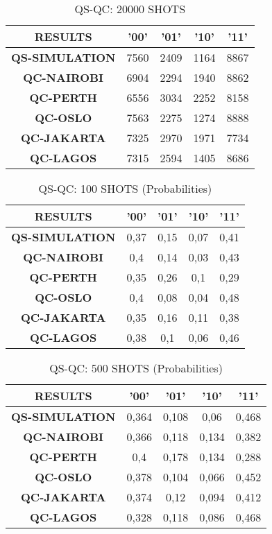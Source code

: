 \begin{table}[!ht]
    \centering
    \begin{tabular}{ccccc}
    \hline
        \textbf{RESULTS} & \textbf{'00'} & \textbf{'01'} & \textbf{'10'} & \textbf{'11' } \\ \hline
        \textbf{QS-SIMULATION} & 7560 & 2409 & 1164 & 8867  \\ 
        \textbf{QC-NAIROBI} & 6904 & 2294 & 1940 & 8862  \\ 
        \textbf{QC-PERTH} & 6556 & 3034 & 2252 & 8158  \\ 
        \textbf{QC-OSLO} & 7563 & 2275 & 1274 & 8888  \\ 
        \textbf{QC-JAKARTA} & 7325 & 2970 & 1971 & 7734  \\ 
        \textbf{QC-LAGOS} & 7315 & 2594 & 1405 & 8686 \\ \hline
    \end{tabular}
    \caption{QS-QC: 20000 SHOTS}
\end{table}

\begin{table}[!ht]
    \centering
    \begin{tabular}{ccccc}
    \hline
        \textbf{RESULTS} & \textbf{'00'} & \textbf{'01'} & \textbf{'10'} & \textbf{'11' } \\ \hline
        \textbf{QS-SIMULATION} & 0,37 & 0,15 & 0,07 & 0,41  \\ 
        \textbf{QC-NAIROBI} & 0,4 & 0,14 & 0,03 & 0,43  \\ 
        \textbf{QC-PERTH} & 0,35 & 0,26 & 0,1 & 0,29  \\ 
        \textbf{QC-OSLO} & 0,4 & 0,08 & 0,04 & 0,48  \\ 
        \textbf{QC-JAKARTA} & 0,35 & 0,16 & 0,11 & 0,38  \\ 
        \textbf{QC-LAGOS} & 0,38 & 0,1 & 0,06 & 0,46 \\ \hline
    \end{tabular}
    \caption{QS-QC: 100 SHOTS (Probabilities)}
\end{table}

\begin{table}[!ht]
    \centering
    \begin{tabular}{ccccc}
    \hline
        \textbf{RESULTS} & \textbf{'00'} & \textbf{'01'} & \textbf{'10'} & \textbf{'11' } \\ \hline
        \textbf{QS-SIMULATION} & 0,364 & 0,108 & 0,06 & 0,468  \\ 
        \textbf{QC-NAIROBI} & 0,366 & 0,118 & 0,134 & 0,382  \\ 
        \textbf{QC-PERTH} & 0,4 & 0,178 & 0,134 & 0,288  \\ 
        \textbf{QC-OSLO} & 0,378 & 0,104 & 0,066 & 0,452  \\ 
        \textbf{QC-JAKARTA} & 0,374 & 0,12 & 0,094 & 0,412  \\ 
        \textbf{QC-LAGOS} & 0,328 & 0,118 & 0,086 & 0,468 \\ \hline
    \end{tabular}
    \caption{QS-QC: 500 SHOTS (Probabilities)}
\end{table}


